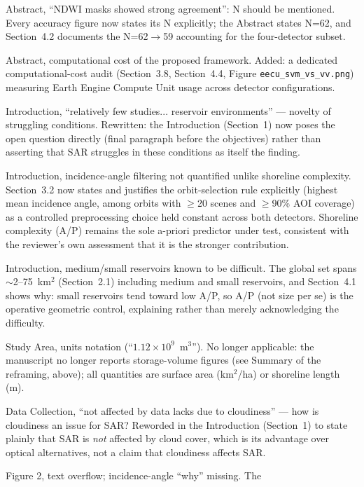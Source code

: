 \documentclass[11pt]{article}
\begin{document}
\begin{resp}
  \item[Abstract, ``NDWI masks showed strong agreement'': N should be
  mentioned.] Every accuracy figure now states its N explicitly; the Abstract
  states N=62, and Section~4.2 documents the N=62$\to$59 accounting for the
  four-detector subset.
  \item[Abstract, computational cost of the proposed framework.] Added: a
  dedicated computational-cost audit (Section~3.8, Section~4.4, Figure
  \texttt{eecu\_svm\_vs\_vv.png}) measuring Earth Engine Compute Unit usage
  across detector configurations.
  \item[Introduction, ``relatively few studies... reservoir environments'' ---
  novelty of struggling conditions.] Rewritten: the Introduction (Section~1)
  now poses the open question directly (final paragraph before the
  objectives) rather than asserting that SAR struggles in these conditions as
  itself the finding.
  \item[Introduction, incidence-angle filtering not quantified unlike
  shoreline complexity.] Section~3.2 now states and justifies the
  orbit-selection rule explicitly (highest mean incidence angle, among
  orbits with $\geq$20 scenes and $\geq$90\% AOI coverage) as a controlled
  preprocessing choice held constant across both detectors. Shoreline
  complexity (A/P) remains the sole a-priori predictor under test, consistent
  with the reviewer's own assessment that it is the stronger contribution.
  \item[Introduction, medium/small reservoirs known to be difficult.] The
  global set spans $\sim$2--75~km$^2$ (Section~2.1) including medium and
  small reservoirs, and Section~4.1 shows why: small reservoirs tend toward
  low A/P, so A/P (not size per se) is the operative geometric control,
  explaining rather than merely acknowledging the difficulty.
  \item[Study Area, units notation (``$1.12\times10^9$~m$^3$'').] No longer
  applicable: the manuscript no longer reports storage-volume figures (see
  Summary of the reframing, above); all quantities are surface area
  (km$^2$/ha) or shoreline length (m).
  \item[Data Collection, ``not affected by data lacks due to cloudiness'' ---
  how is cloudiness an issue for SAR?] Reworded in the Introduction
  (Section~1) to state plainly that SAR is \emph{not} affected by cloud
  cover, which is its advantage over optical alternatives, not a claim that
  cloudiness affects SAR.
  \item[Figure 2, text overflow; incidence-angle ``why'' missing.] The

\end{resp}
\end{document}
